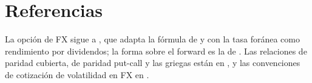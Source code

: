 \section{Referencias}\label{sec:cap04-referencias}

La opción de FX sigue a \citet{garman1983}, que adapta la fórmula de \citet{black1973} y \citet{merton1973} con
la tasa foránea como rendimiento por dividendos; la forma sobre el forward es la de \citet{black1976}. Las
relaciones de paridad cubierta, de paridad put-call y las griegas están en \citet{hull2018}, y las convenciones
de cotización de volatilidad en FX en \citet{wystup2017}.
